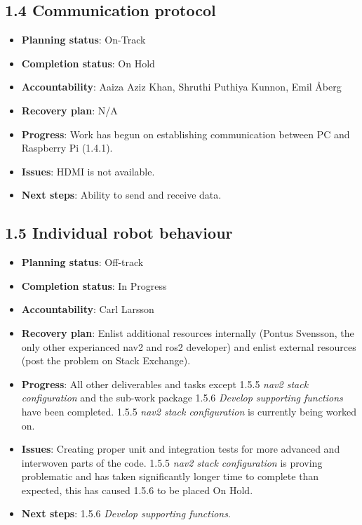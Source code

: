 
\subsection*{1.4 Communication protocol}
\begin{itemize}
    \item \textbf{Planning status}: On-Track
    \item \textbf{Completion status}: On Hold
    \item \textbf{Accountability}: Aaiza Aziz Khan, Shruthi Puthiya Kunnon, Emil Åberg
    \item \textbf{Recovery plan}: N/A
    \item \textbf{Progress}: Work has begun on establishing communication between PC and Raspberry Pi (1.4.1).   
    \item \textbf{Issues}: HDMI is not available.
    \item \textbf{Next steps}: Ability to send and receive data.
\end{itemize}

\subsection*{1.5 Individual robot behaviour}
\begin{itemize}
    \item \textbf{Planning status}: Off-track
    \item \textbf{Completion status}: In Progress
    \item \textbf{Accountability}: Carl Larsson
    \item \textbf{Recovery plan}: Enlist additional resources internally (Pontus Svensson, the only other experianced nav2 and \ac{ros2} developer) and enlist external resources (post the problem on Stack Exchange).
    \item \textbf{Progress}: All other deliverables and tasks except 1.5.5 \textit{nav2 stack configuration} and the sub-work package 1.5.6 \textit{Develop supporting functions} have been completed. 1.5.5 \textit{nav2 stack configuration} is currently being worked on.
    \item \textbf{Issues}: Creating proper unit and integration tests for more advanced and interwoven parts of the code. 1.5.5 \textit{nav2 stack configuration} is proving problematic and has taken significantly longer time to complete than expected, this has caused 1.5.6 to be placed On Hold.
    \item \textbf{Next steps}: 1.5.6 \textit{Develop supporting functions}.
\end{itemize}

